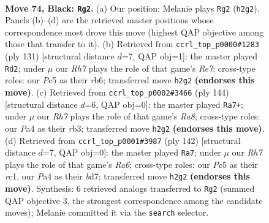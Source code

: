 \documentclass[11pt]{article}
\begin{document}
\clearpage

\begin{figure}[p]\centering
\begin{subfigure}{0.46\textwidth}\centering
\resizebox{\linewidth}{!}{%
\newchessgame
\chessboard[
  setfen={8/4k3/8/2pp4/p7/8/7r/4K3 b - - 5 74},
  showmover=false,
  pgfstyle=straightmove, color=movearrow, markmove={h2-g2}
]}
\caption{}
\end{subfigure}\hfill
\begin{subfigure}{0.46\textwidth}\centering
\resizebox{\linewidth}{!}{%
\newchessgame
\chessboard[
  setfen={8/5k2/1R6/6p1/6P1/8/4r3/6K1 b - - 4 66},
  showmover=false,
  pgfstyle=straightmove, color=movearrow, markmove={e2-d2}
]}
\caption{}
\end{subfigure}
\\[4pt]
\begin{subfigure}{0.46\textwidth}\centering
\resizebox{\linewidth}{!}{%
\newchessgame
\chessboard[
  setfen={R7/4k3/8/6Pp/8/1r6/8/4K3 w - - 13 73},
  showmover=false,
  pgfstyle=straightmove, color=movearrow, markmove={a8-a7}
]}
\caption{}
\end{subfigure}\hfill
\begin{subfigure}{0.46\textwidth}\centering
\resizebox{\linewidth}{!}{%
\newchessgame
\chessboard[
  setfen={8/3b4/R7/4k2P/8/8/5K2/2r5 w - - 2 72},
  showmover=false,
  pgfstyle=straightmove, color=movearrow, markmove={a6-a7}
]}
\caption{}
\end{subfigure}
\caption{\textbf{Move 74, Black: \texttt{Rg2}.} (a) Our position; Melanie plays \texttt{Rg2} (\texttt{h2g2}). Panels (b)--(d) are the retrieved master positions whose correspondence most drove this move (highest QAP objective among those that transfer to it). (b) Retrieved from \texttt{ccrl\_top\_p0000\#1283} (ply 131) [structural distance $d$=7, QAP obj=1]: the master played \texttt{Rd2}; under $\mu$ our \emph{Rh7} plays the role of that game's \emph{Re7}; cross-type roles: our \emph{P}c5 as their \emph{r}b6; transferred move \texttt{h2g2} \textbf{(endorses this move)}. (c) Retrieved from \texttt{ccrl\_top\_p0002\#3466} (ply 144) [structural distance $d$=6, QAP obj=0]: the master played \texttt{Ra7+}; under $\mu$ our \emph{Rh7} plays the role of that game's \emph{Ra8}; cross-type roles: our \emph{P}a4 as their \emph{r}b3; transferred move \texttt{h2g2} \textbf{(endorses this move)}. (d) Retrieved from \texttt{ccrl\_top\_p0001\#3987} (ply 142) [structural distance $d$=7, QAP obj=0]: the master played \texttt{Ra7}; under $\mu$ our \emph{Rh7} plays the role of that game's \emph{Ra6}; cross-type roles: our \emph{P}c5 as their \emph{r}c1, our \emph{P}a4 as their \emph{b}d7; transferred move \texttt{h2g2} \textbf{(endorses this move)}. Synthesis: 6 retrieved analogs transferred to \texttt{Rg2} (summed QAP objective 3, the strongest correspondence among the candidate moves); Melanie committed it via the \texttt{search} selector.}
\label{fig:thought-m147}
\end{figure}
\end{document}

